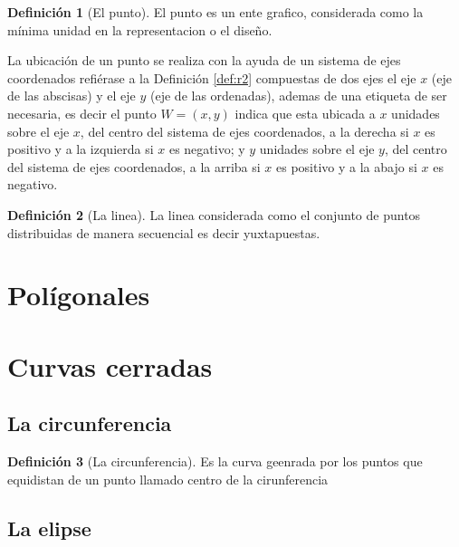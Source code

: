 \documentclass[
  16pt,
]{krantz}
\theoremstyle{definition}
\newtheorem{definition}{Definición}[chapter]
\theoremstyle{definition}
\theoremstyle{definition}
\theoremstyle{definition}
\theoremstyle{remark}
\begin{document}
\begin{definition}[El punto]
\protect\hypertarget{def:punto}{}{\label{def:punto} {} }El punto es un ente grafico, considerada como la mínima unidad en la representacion o el diseño.
\end{definition}

La ubicación de un punto se realiza con la ayuda de un sistema de ejes coordenados refiérase a la Definición \ref{def:r2} compuestas de dos ejes el eje \(x\) (eje de las abscisas) y el eje \(y\) (eje de las ordenadas), ademas de una etiqueta de ser necesaria, es decir el punto \(W=(x,y)\) indica que esta ubicada a \(x\) unidades sobre el eje \(x\), del centro del sistema de ejes coordenados, a la derecha si \(x\) es positivo y a la izquierda si \(x\) es negativo; y \(y\) unidades sobre el eje \(y\), del centro del sistema de ejes coordenados, a la arriba si \(x\) es positivo y a la abajo si \(x\) es negativo.

\begin{definition}[La linea]
\protect\hypertarget{def:linea}{}{\label{def:linea} {} }La linea considerada como el conjunto de puntos distribuidas de manera secuencial es decir yuxtapuestas.
\end{definition}

\hypertarget{poluxedgonales}{%
\section{Polígonales}\label{poluxedgonales}}

\hypertarget{curvas-cerradas}{%
\section{Curvas cerradas}\label{curvas-cerradas}}

\hypertarget{la-circunferencia}{%
\subsection{La circunferencia}\label{la-circunferencia}}

\begin{definition}[La circunferencia]
\protect\hypertarget{def:circulo}{}{\label{def:circulo} {} }Es la curva geenrada por los puntos que equidistan de un punto llamado centro de la cirunferencia
\end{definition}

\hypertarget{la-elipse}{%
\subsection{La elipse}\label{la-elipse}}
\end{document}
